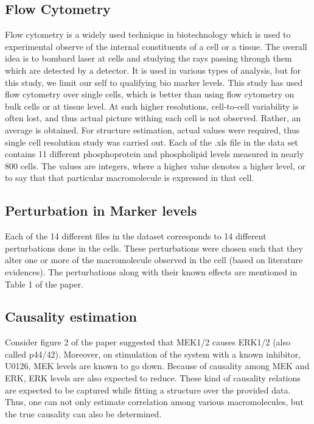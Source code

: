 \documentclass[conference]{IEEEtran}
\begin{document}
\subsection*{Flow Cytometry}
Flow cytometry \cite{o2013flow} is a widely used technique in biotechnology which is used to experimental observe of the internal constituents of a cell or a tissue. The overall idea is to bombard laser at cells and studying the rays passing through them which are detected by a detector. It is used in various types of analysis, but for this study, we limit our self to qualifying bio marker levels.
\newline
This study has used flow cytometry over single cells, which is better than using flow cytometry on bulk cells or at tissue level. At such higher resolutions, cell-to-cell variability is often lost, and thus actual picture withing each cell is not observed. Rather, an average is obtained. For structure estimation, actual values were required, thus single cell resolution study was carried out.
\newline
Each of the .xls file in the data set contains 11 different phosphoprotein and phospholipid levels measured in nearly 800 cells. The values are integers, where a higher value denotes a higher level, or to say that that particular macromolecule is expressed in that cell.

\subsection*{Perturbation in Marker levels}
Each of the 14 different files in the dataset corresponds to 14 different perturbations done in the cells. These perturbations were chosen such that they alter one or more of the macromolecule observed in the cell (based on literature evidences). The perturbations along with their known effects are mentioned in Table 1 of the paper. 

\subsection*{Causality estimation}
Consider figure 2 of the paper suggested that MEK1/2 causes ERK1/2 (also called p44/42). Moreover, on stimulation of the system with a known inhibitor, U0126, MEK levels are known to go down. Because of causality among MEK and ERK, ERK levels are also expected to reduce. These kind of causality relations are expected to be captured while fitting a structure over the provided data. Thus, one can not only estimate correlation among various macromolecules, but the true causality can also be determined. 
\end{document}
